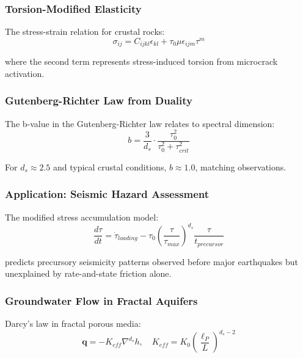 \subsubsection{Torsion-Modified Elasticity}

The stress-strain relation for crustal rocks:
\begin{equation}
    \sigma_{ij} = C_{ijkl} \epsilon_{kl} + \tau_0 \mu \epsilon_{ijm} \tau^m
\end{equation}

where the second term represents stress-induced torsion from microcrack activation.

\subsubsection{Gutenberg-Richter Law from Duality}

The b-value in the Gutenberg-Richter law relates to spectral dimension:
\begin{equation}
    b = \frac{3}{d_s} \cdot \frac{\tau_0^2}{\tau_0^2 + \tau_{crit}^2}
\end{equation}

For $d_s \approx 2.5$ and typical crustal conditions, $b \approx 1.0$, matching observations.

\subsubsection{Application: Seismic Hazard Assessment}

The modified stress accumulation model:
\begin{equation}
    \frac{d\tau}{dt} = \dot{\tau}_{loading} - \tau_0 \left(\frac{\tau}{\tau_{max}}\right)^{d_s} \frac{\tau}{t_{precursor}}
\end{equation}

predicts precursory seismicity patterns observed before major earthquakes but unexplained by rate-and-state friction alone.

\subsubsection{Groundwater Flow in Fractal Aquifers}

Darcy's law in fractal porous media:
\begin{equation}
    \mathbf{q} = -K_{eff} \nabla^{d_s} h, \quad K_{eff} = K_0 \left(\frac{\ell_P}{L}\right)^{d_s-2}
\end{equation}

